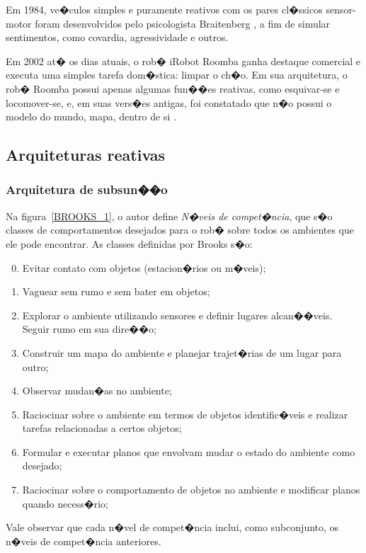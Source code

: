 Em 1984, ve�culos simples e puramente reativos com os pares cl�ssicos
sensor-motor foram desenvolvidos pelo psicologista Braitenberg
\cite{braitenberg1986vehicles}, a fim de simular sentimentos, como covardia,
agressividade e outros. 

Em 2002 at� os dias atuais, o rob� iRobot Roomba ganha destaque comercial e
executa uma simples tarefa dom�stica: limpar o ch�o. Em sua arquitetura, o rob�
Roomba possui apenas algumas fun��es reativas, como esquivar-se e locomover-se,
e, em suas vers�es antigas, foi constatado que n�o possui o modelo do mundo,
mapa, dentro de si \cite{tribelhorn2007evaluating}.

\subsection{Arquiteturas reativas}


\subsubsection{Arquitetura de subsun��o}
Na figura~\ref{BROOKS_1}, o autor define \emph{N�veis de compet�ncia}, que s�o
classes de comportamentos desejados para o rob� sobre todos os ambientes que ele
pode encontrar. As classes definidas por Brooks s�o:
\begin{enumerate}
\setcounter{enumi}{-1}
  \item Evitar contato com objetos (estacion�rios ou m�veis);
  \item Vaguear sem rumo e sem bater em objetos;
  \item Explorar o ambiente utilizando sensores e definir lugares alcan��veis.
  Seguir rumo em sua dire��o;
  \item Construir um mapa do ambiente e planejar trajet�rias de um lugar para
  outro;
  \item Observar mudan�as no ambiente;
  \item Raciocinar sobre o ambiente em termos de objetos identific�veis e
  realizar tarefas relacionadas a certos objetos;
  \item Formular e executar planos que envolvam mudar o estado do ambiente como
  desejado;
  \item Raciocinar sobre o comportamento de objetos no ambiente e modificar
  planos quando necess�rio;
\end{enumerate}

Vale observar que cada n�vel de compet�ncia inclui, como subconjunto, os
n�veis de compet�ncia anteriores.

